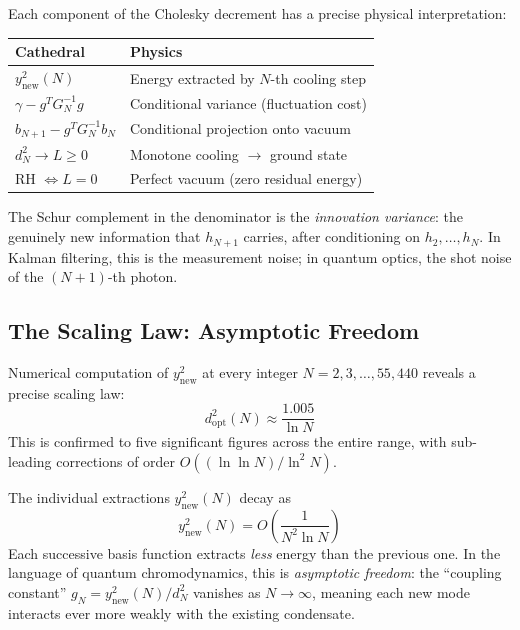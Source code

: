 \begin{correspondence}
\label{corr:y2new}
Each component of the Cholesky decrement has a precise physical
interpretation:
\begin{center}
\begin{tabular}{@{}ll@{}}
\toprule
\textbf{Cathedral} & \textbf{Physics} \\
\midrule
$y^2_{\mathrm{new}}(N)$ & Energy extracted by $N$-th cooling step \\
$\gamma - g^T G_N^{-1} g$ & Conditional variance (fluctuation cost) \\
$b_{N+1} - g^T G_N^{-1} b_N$ & Conditional projection onto vacuum \\
$d^2_N \to L \geq 0$ & Monotone cooling $\to$ ground state \\
RH $\iff L = 0$ & Perfect vacuum (zero residual energy) \\
\bottomrule
\end{tabular}
\end{center}
The Schur complement in the denominator is the \emph{innovation
variance}: the genuinely new information that $h_{N+1}$ carries,
after conditioning on $h_2, \ldots, h_N$. In Kalman filtering,
this is the measurement noise; in quantum optics, the shot noise
of the $(N+1)$-th photon.
\end{correspondence}

\subsection{The Scaling Law: Asymptotic Freedom}

Numerical computation of $y^2_{\mathrm{new}}$ at every integer
$N = 2, 3, \ldots, 55{,}440$ reveals a precise scaling law:
\begin{equation}
  d^2_{\mathrm{opt}}(N) \approx \frac{1.005}{\ln N}
  \label{eq:scaling}
\end{equation}
This is confirmed to five significant figures across the entire
range, with sub-leading corrections of order $O((\ln\ln N)/\ln^2 N)$.

The individual extractions $y^2_{\mathrm{new}}(N)$ decay as
\[
  y^2_{\mathrm{new}}(N) = O\!\left(\frac{1}{N^2 \ln N}\right)
\]
Each successive basis function extracts \emph{less} energy than the
previous one. In the language of quantum chromodynamics, this is
\emph{asymptotic freedom}: the ``coupling constant''
$g_N = y^2_{\mathrm{new}}(N) / d^2_N$ vanishes as $N \to \infty$,
meaning each new mode interacts ever more weakly with the existing
condensate.


